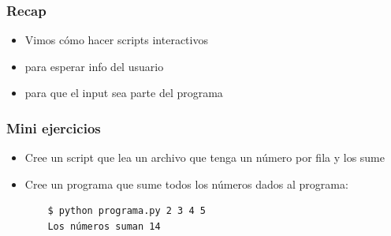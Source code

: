 \documentclass[14pt,aspectratio=169,xcolor=dvipsnames]{beamer}
\begin{document}
\begin{frame}


\end{frame}
\begin{frame}\frametitle{Recap}
    \begin{itemize}
        \item Vimos cómo hacer scripts interactivos
        \item {} para esperar info del usuario
        \item {} para que el input sea parte del programa
    \end{itemize}
\end{frame}
\begin{frame}
    \maketitle
\end{frame}
\begin{frame}[fragile]\frametitle{Mini ejercicios}
    \begin{itemize}
        \item Cree un script que lea un archivo que tenga un número por fila y los sume
        \item Cree un programa que sume todos los números dados al programa: 
        \begin{verbatim}
    $ python programa.py 2 3 4 5  
    Los números suman 14
        \end{verbatim}

    \end{itemize}
\end{frame}
\end{document}
